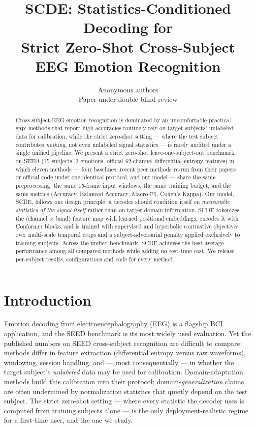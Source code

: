 \documentclass{article}
\title{SCDE: Statistics-Conditioned Decoding for\\ Strict Zero-Shot Cross-Subject EEG Emotion Recognition}
\author{Anonymous authors\\ Paper under double-blind review}
\newcommand{\method}{SCDE}
\begin{document}
\maketitle

\begin{abstract}
Cross-subject EEG emotion recognition is dominated by an uncomfortable
practical gap: methods that report high accuracies routinely rely on target
subjects' unlabeled data for calibration, while the strict zero-shot setting
--- where the test subject contributes \emph{nothing}, not even unlabeled
signal statistics --- is rarely audited under a single unified pipeline. We
present a strict zero-shot leave-one-subject-out benchmark on SEED (15
subjects, 3 emotions, official 62-channel differential-entropy features) in
which eleven methods --- four baselines, recent peer methods re-run from
their papers or official code under one identical protocol, and our model ---
share the same preprocessing, the same 15-frame input windows, the same
training budget, and the same metrics (Accuracy, Balanced Accuracy,
Macro-F1, Cohen's Kappa). Our model, \method{}, follows one design principle:
a decoder should condition itself on \emph{measurable statistics of the
signal itself} rather than on target-domain information. \method{}
tokenizes the (channel $\times$ band) feature map with learned positional
embeddings, encodes it with Conformer blocks, and is trained with supervised
and hyperbolic contrastive objectives over multi-scale temporal crops and a
subject-adversarial penalty applied exclusively to training subjects.
Across the unified benchmark, \method{} achieves the best average
performance among all compared methods while adding no test-time cost.
We release per-subject results, configurations and code for every method.
\end{abstract}

\section{Introduction}
\label{sec:intro}

Emotion decoding from electroencephalography (EEG) is a flagship BCI
application, and the SEED benchmark \citep{zheng2015seed} is its most widely
used evaluation. Yet the published numbers on SEED cross-subject recognition
are difficult to compare: methods differ in feature extraction (differential
entropy versus raw waveforms), windowing, session handling, and --- most
consequentially --- in whether the target subject's \emph{unlabeled} data
may be used for calibration. Domain-adaptation methods build this
calibration into their protocol; domain-\emph{generalization} claims are
often undermined by normalization statistics that quietly depend on the
test subject. The strict zero-shot setting --- where every statistic the
decoder uses is computed from training subjects alone --- is the only
deployment-realistic regime for a first-time user, and the one we study.
\end{document}
